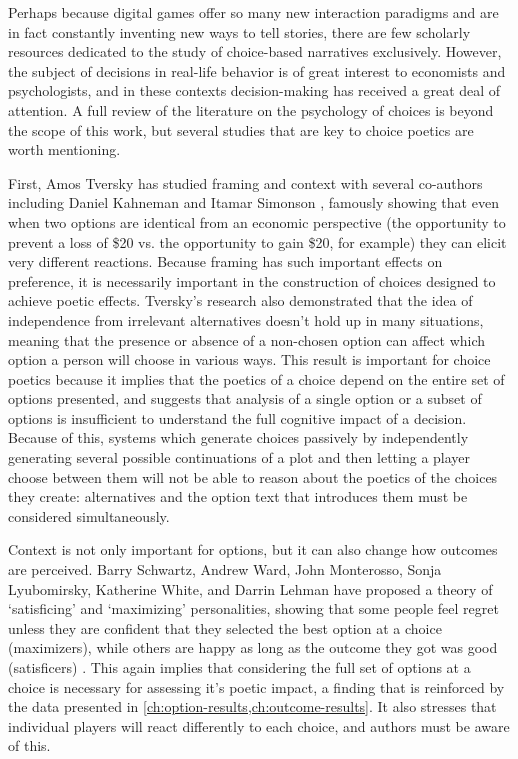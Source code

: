 Perhaps because digital games offer so many new interaction paradigms and are in fact constantly inventing new ways to tell stories, there are few scholarly resources dedicated to the study of choice-based narratives exclusively.
%
However, the subject of decisions in real-life behavior is of great interest to economists and psychologists, and in these contexts decision-making has received a great deal of attention.
%
A full review of the literature on the psychology of choices is beyond the scope of this work, but several studies that are key to choice poetics are worth mentioning.


First, Amos Tversky has studied framing and context with several co-authors including Daniel Kahneman \citep{Tversky1981} and Itamar Simonson \citep{Tversky1993}, famously showing that even when two options are identical from an economic perspective (the opportunity to prevent a loss of \$20 vs\@. the opportunity to gain \$20, for example) they can elicit very different reactions.
%
Because framing has such important effects on preference, it is necessarily important in the construction of choices designed to achieve poetic effects.
%
Tversky's research also demonstrated that the idea of independence from irrelevant alternatives doesn't hold up in many situations, meaning that the presence or absence of a non-chosen option can affect which option a person will choose in various ways.
%
This result is important for choice poetics because it implies that the poetics of a choice depend on the entire set of options presented, and suggests that analysis of a single option or a subset of options is insufficient to understand the full cognitive impact of a decision.
%
Because of this, systems which generate choices passively by independently generating several possible continuations of a plot and then letting a player choose between them will not be able to reason about the poetics of the choices they create: alternatives and the option text that introduces them must be considered simultaneously.


Context is not only important for options, but it can also change how outcomes are perceived.
%
Barry Schwartz, Andrew Ward, John Monterosso, Sonja Lyubomirsky, Katherine White, and Darrin Lehman have proposed a theory of `satisficing' and `maximizing' personalities, showing that some people feel regret unless they are confident that they selected the best option at a choice (maximizers), while others are happy as long as the outcome they got was good (satisficers) \citep{Schwartz2002}.
%
This again implies that considering the full set of options at a choice is necessary for assessing it's poetic impact, a finding that is reinforced by the data presented in \cref{ch:option-results,ch:outcome-results}.
%
It also stresses that individual players will react differently to each choice, and authors must be aware of this.


